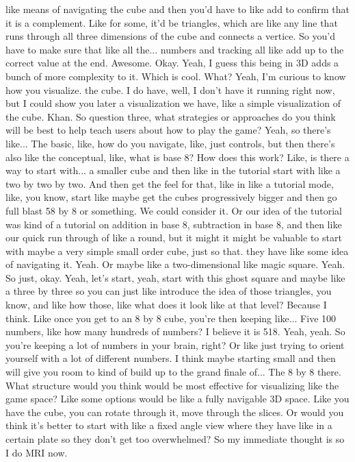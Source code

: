 \documentclass{article}
\begin{document}
like means of navigating the cube and then you'd have to like add to confirm that it is a complement. Like for some, it'd be triangles, which are like any line that runs through all three dimensions of the cube and connects a vertice. So you'd have to make sure that like all the...
numbers and tracking all like add up to the correct value at the end. Awesome. Okay. Yeah, I guess this being in 3D adds a bunch of more complexity to it. Which is cool.
What? Yeah, I'm curious to know how you visualize.
the cube. I do have, well, I don't have it running right now, but I could show you later a visualization we have, like a simple visualization of the cube.
Khan.
So question three, what strategies or approaches do you think will be best to help teach users about how to play the game?
Yeah, so there's like...
The basic, like, how do you navigate, like, just controls, but then there's also like the conceptual, like, what is base 8? How does this work? Like, is there a way to start with...
a smaller cube and then like in the tutorial start with like a two by two by two.
And then get the feel for that, like in like a tutorial mode, like, you know, start like maybe get the cubes progressively bigger and then go full blast 58 by 8 or something. We could consider it.
Or our idea of the tutorial was kind of a tutorial on addition in base 8, subtraction in base 8, and then like our quick run through of like a round, but it might it might be valuable to start with maybe a very simple small order cube, just so that.
they have like some idea of navigating it. Yeah. Or maybe like a two-dimensional like magic square. Yeah. So just, okay. Yeah, let's start, yeah, start with this ghost square and maybe like a three by three so you can just like introduce the idea of those triangles, you know, and like how those, like what does it look like at that level? Because I think.
Like once you get to an 8 by 8 cube, you're then keeping like...
Five 100 numbers, like how many hundreds of numbers? I believe it is 518. Yeah, yeah. So you're keeping a lot of numbers in your brain, right? Or like just trying to orient yourself with a lot of different numbers. I think maybe starting small and then will give you room to kind of build up to the grand finale of...
The 8 by 8 there.
What structure would you think would be most effective for visualizing like the game space?
Like some options would be like a fully navigable 3D space. Like you have the cube, you can rotate through it, move through the slices. Or would you think it's better to start with like a fixed angle view where they have like in a certain plate so they don't get too overwhelmed? So my immediate thought is so I do MRI now.
\end{document}
